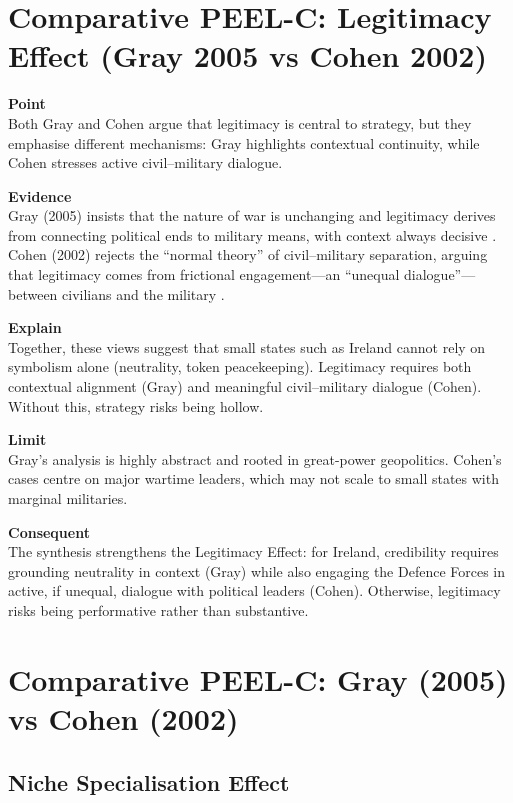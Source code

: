\section*{Comparative PEEL-C: Legitimacy Effect (Gray 2005 vs Cohen 2002)}

\textbf{Point} \\
Both Gray and Cohen argue that legitimacy is central to strategy, but they emphasise different mechanisms: Gray highlights contextual continuity, while Cohen stresses active civil--military dialogue.  

\textbf{Evidence} \\
Gray (2005) insists that the nature of war is unchanging and legitimacy derives from connecting political ends to military means, with context always decisive \parencite{GRAY_2005}.  
Cohen (2002) rejects the ``normal theory'' of civil--military separation, arguing that legitimacy comes from frictional engagement---an ``unequal dialogue''---between civilians and the military \parencite{COHEN_2002}.  

\textbf{Explain} \\
Together, these views suggest that small states such as Ireland cannot rely on symbolism alone (neutrality, token peacekeeping). Legitimacy requires both contextual alignment (Gray) and meaningful civil--military dialogue (Cohen). Without this, strategy risks being hollow.  

\textbf{Limit} \\
Gray’s analysis is highly abstract and rooted in great-power geopolitics. Cohen’s cases centre on major wartime leaders, which may not scale to small states with marginal militaries.  

\textbf{Consequent} \\
The synthesis strengthens the Legitimacy Effect: for Ireland, credibility requires grounding neutrality in context (Gray) while also engaging the Defence Forces in active, if unequal, dialogue with political leaders (Cohen). Otherwise, legitimacy risks being performative rather than substantive.  

\section*{Comparative PEEL-C: Gray (2005) vs Cohen (2002)}

\subsection*{Niche Specialisation Effect}

